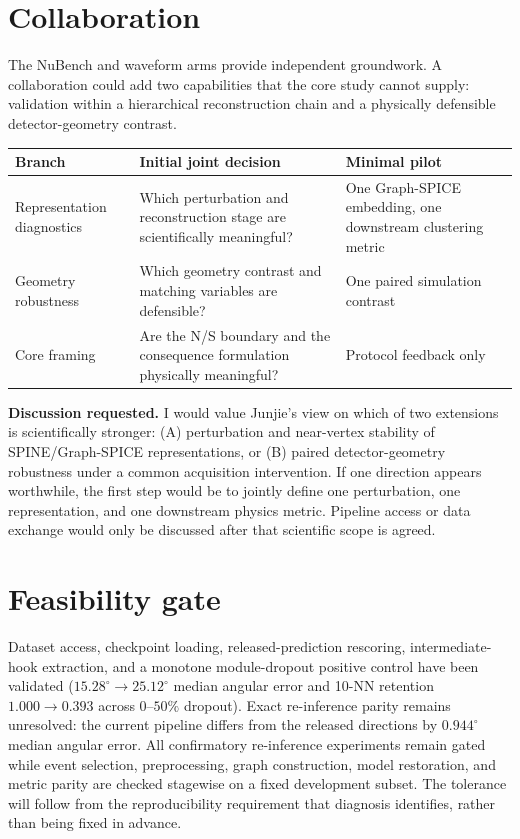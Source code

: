 \documentclass[10pt,twocolumn]{extarticle}
\begin{document}
\section{Collaboration}

The NuBench and waveform arms provide independent groundwork. A collaboration
could add two capabilities that the core study cannot supply: validation within
a hierarchical reconstruction chain and a physically defensible
detector-geometry contrast.

\begin{center}
\scriptsize
{}
\begin{tabularx}{\columnwidth}{@{}p{0.62in}p{0.95in}Y@{}}
\toprule
Branch & Initial joint decision & Minimal pilot \\
\midrule
Representation diagnostics & Which perturbation and reconstruction stage are
scientifically meaningful? & One Graph-SPICE embedding, one downstream
clustering metric \\
Geometry robustness & Which geometry contrast and matching variables are
defensible? & One paired simulation contrast \\
Core framing & Are the N/S boundary and the consequence formulation
physically meaningful? & Protocol feedback only \\
\bottomrule
\end{tabularx}
\label{tab:branches}
\vspace{-0.4em}
\end{center}

\textbf{Discussion requested.} I would value Junjie's view on which of two
extensions is scientifically stronger: (A) perturbation and near-vertex
stability of SPINE/Graph-SPICE representations, or (B) paired detector-geometry
robustness under a common acquisition intervention. If one direction appears
worthwhile, the first step would be to jointly define one perturbation, one
representation, and one downstream physics metric. Pipeline access or data
exchange would only be discussed after that scientific scope is agreed.

\section{Feasibility gate}

Dataset access, checkpoint loading, released-prediction rescoring,
intermediate-hook extraction, and a monotone module-dropout positive control
have been validated ($15.28^\circ\!\to\!25.12^\circ$ median angular error and
10-NN retention $1.000\!\to\!0.393$ across $0$--$50\%$ dropout). Exact
re-inference parity remains unresolved: the current pipeline differs from the
released directions by $0.944^\circ$ median angular error. All confirmatory
re-inference experiments remain gated while event selection, preprocessing,
graph construction, model restoration, and metric parity are checked stagewise
on a fixed development subset. The tolerance will follow from the
reproducibility requirement that diagnosis identifies, rather than being fixed
in advance.
\end{document}
